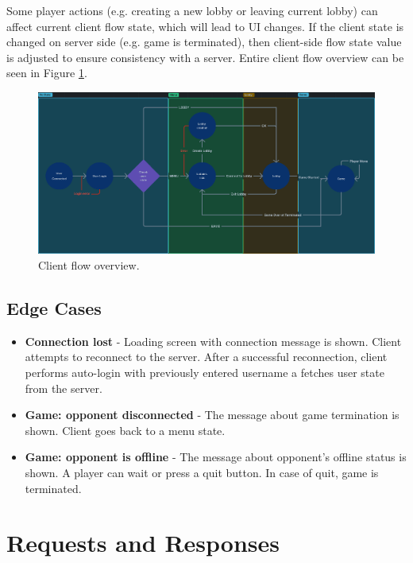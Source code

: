 \documentclass[english, sem, kiv, he, iso690alph, pdf, viewonly]{fasthesis}
\begin{document}
\newpage

Some player actions (e.g. creating a new lobby or leaving current lobby) can affect current client flow state, which will lead to \ac{UI} changes. If the client state is changed on server side (e.g. game is terminated), then client-side flow state value is adjusted to ensure consistency with a server. Entire client flow overview can be seen in Figure \ref{fig:client_flow_overview}.

\begin{figure}[h!]
	\centering
	\begin{minipage}[b]{1.0\textwidth}
		\centering
		\includegraphics[width=\textwidth]{resources/client-flow.png}
    \end{minipage}
	\caption{Client flow overview.}
	\label{fig:client_flow_overview}
\end{figure}

\section{Edge Cases}

\begin{itemize}
	\item \textbf{Connection lost} - Loading screen with connection message is shown. Client attempts to reconnect to the server. After a successful reconnection, client performs auto-login with previously entered username a fetches user state from the server.
	\item \textbf{Game: opponent disconnected} - The message about game termination is shown. Client goes back to a menu state.
	\item \textbf{Game: opponent is offline} - The message about opponent's offline status is shown. A player can wait or press a quit button. In case of quit, game is terminated. 
\end{itemize}

\chapter{Requests and Responses}
\end{document}
